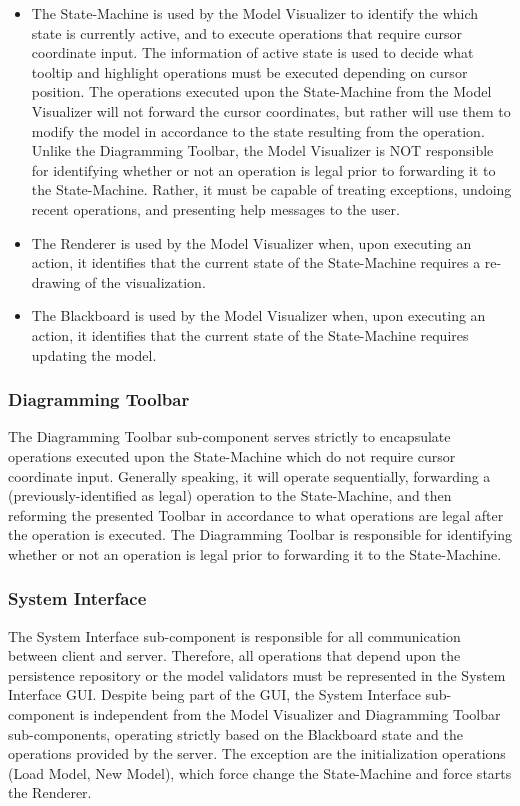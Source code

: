 \begin{itemize}
    \item The State-Machine is used by the Model Visualizer to identify the which state is currently active, and to execute operations that require cursor coordinate input. The information of active state is used to decide what tooltip and highlight operations must be executed depending on cursor position. The operations executed upon the State-Machine from the Model Visualizer will not forward the cursor coordinates, but rather will use them to modify the model in accordance to the state resulting from the operation. Unlike the Diagramming Toolbar, the Model Visualizer is NOT responsible for identifying whether or not an operation is legal prior to forwarding it to the State-Machine. Rather, it must be capable of treating exceptions, undoing recent operations, and presenting help messages to the user.
    
    \item The Renderer is used by the Model Visualizer when, upon executing an action, it identifies that the current state of the State-Machine requires a re-drawing of the visualization.
    
    \item The Blackboard is used by the Model Visualizer when, upon executing an action, it identifies that the current state of the State-Machine requires updating the model.
\end{itemize}


\subsubsection{Diagramming Toolbar}

The Diagramming Toolbar sub-component serves strictly to encapsulate operations executed upon the State-Machine which do not require cursor coordinate input. Generally speaking, it will operate sequentially, forwarding a (previously-identified as legal) operation to the State-Machine, and then reforming the presented Toolbar in accordance to what operations are legal after the operation is executed. The Diagramming Toolbar is responsible for identifying whether or not an operation is legal prior to forwarding it to the State-Machine.


\subsubsection{System Interface}

The System Interface sub-component is responsible for all communication between client and server. Therefore, all operations that depend upon the persistence repository or the model validators must be represented in the System Interface GUI. Despite being part of the GUI, the System Interface sub-component is independent from the Model Visualizer and Diagramming Toolbar sub-components, operating strictly based on the Blackboard state and the operations provided by the server. The exception are the initialization operations (Load Model, New Model), which force change the State-Machine and force starts the Renderer.